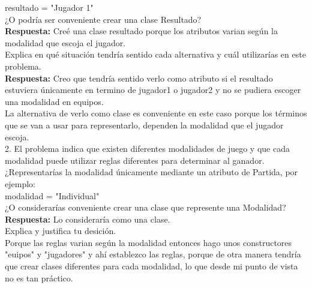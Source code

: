 \documentclass[12pt]{article}
\begin{document}
resultado = "Jugador 1" \\
 
¿O podría ser conveniente crear una clase Resultado? \\

\textbf{Respuesta:} Creé una clase resultado porque los atributos varian según la modalidad que escoja el jugador. \\

Explica en qué situación tendría sentido cada alternativa y cuál utilizarías
en este problema. \\

\textbf{Respuesta:} Creo que tendría sentido verlo como atributo si el resultado estuviera únicamente en termino de jugador1 o jugador2 y no se pudiera escoger una modalidad en equipos. \\

La alternativa de verlo como clase es conveniente en este caso porque los términos que se van a usar para representarlo, dependen la modalidad que el jugador escoja. \\

2. El problema indica que existen diferentes modalidades de juego y que cada
modalidad puede utilizar reglas diferentes para determinar al ganador. \\

¿Representarías la modalidad únicamente mediante un atributo de Partida,
por ejemplo: \\

modalidad = "Individual" \\

¿O considerarías conveniente crear una clase que represente una Modalidad? \\

\textbf{Respuesta:}
Lo consideraría como una clase. \\

Explica y justifica tu desición. \\

Porque las reglas varian según la modalidad entonces hago unos constructores "euipos" y "jugadores" y ahí establezco las reglas, porque de otra manera tendría que crear clases diferentes para cada modalidad, lo que desde mi punto de vista no es tan práctico.
\end{document}
